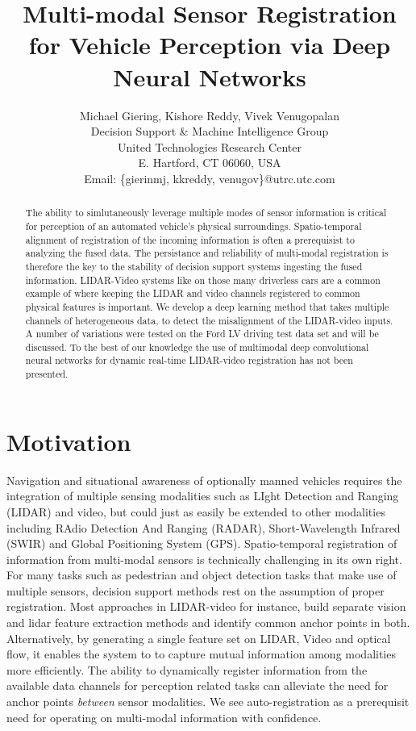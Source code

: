 \documentclass{article}
\title{Multi-modal Sensor Registration for Vehicle Perception via Deep Neural Networks}
\author{Michael Giering, Kishore Reddy, Vivek Venugopalan\\
Decision Support \& Machine Intelligence Group \\
United Technologies Research Center\\
E. Hartford, CT 06060, USA \\
Email: \{gierinmj, kkreddy, venugov\}@utrc.utc.com}
\begin{document}
\maketitle

\begin{abstract}

The ability to simlutaneously leverage multiple modes of sensor information is critical for perception of an automated vehicle's physical surroundings. Spatio-temporal alignment of registration of the incoming information is often a prerequisist to analyzing the fused data. The persistance and reliability of multi-modal registration is therefore the key to the stability of decision support systems ingesting the fused information. LIDAR-Video systems like on those many driverless cars are a common example of where keeping the LIDAR and video channels registered to common physical features is important. We develop a deep learning method that takes multiple channels of heterogeneous data, to detect the misalignment of the LIDAR-video inputs.  A number of variations were tested on the Ford LV driving test data set and will be discussed. To the best of our knowledge the use of multimodal deep convolutional neural networks for dynamic real-time LIDAR-video registration has not been presented.

\end{abstract}

\section{Motivation} %
\label{sec:motivation}
Navigation and situational awareness of optionally manned vehicles requires the integration of multiple sensing modalities such as LIght Detection and Ranging (LIDAR) and video, but could just as easily be extended to other modalities including RAdio Detection And Ranging (RADAR), Short-Wavelength Infrared (SWIR) and Global Positioning System (GPS). Spatio-temporal registration of information from multi-modal sensors is technically challenging in its own right. For many tasks such as pedestrian and object detection tasks that make use of multiple sensors, decision support methods rest on the assumption of proper registration. Most approaches \cite{Bodensteiner2012Real-time-} in LIDAR-video for instance, build separate vision and lidar feature extraction methods and identify common anchor points in both. Alternatively, by generating a single feature set on LIDAR, Video and optical flow, it enables the system to to capture mutual information among modalities more efficiently. The ability to dynamically register information from the available data channels for perception related tasks can alleviate the need for anchor points \emph{between} sensor modalities. We see auto-registration as a prerequisit need for operating on multi-modal information with confidence.
\end{document}
